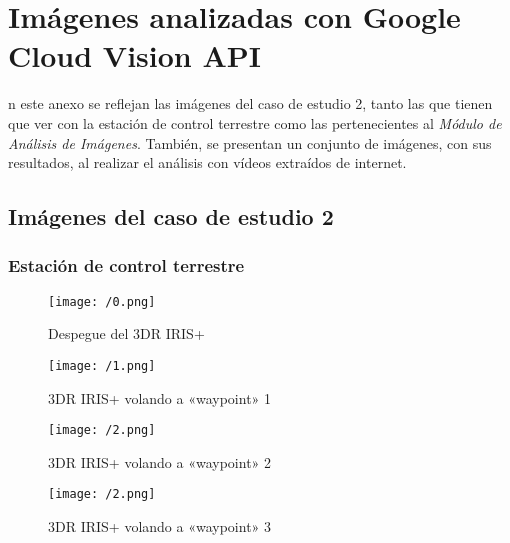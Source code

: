 \chapter{Imágenes analizadas con Google Cloud Vision \acs{API}}
\label{chap:imagenes}

n este anexo se reflejan las imágenes del caso de estudio 2, tanto las que tienen que ver con la estación de control terrestre como las pertenecientes al \textit{Módulo de Análisis de Imágenes}. También, se presentan un conjunto de imágenes, con sus resultados, al realizar el análisis con vídeos extraídos de internet.

\section{Imágenes del caso de estudio 2}

\subsection{Estación de control terrestre}

\begin{figure}[!h]
\begin{center}
\texttt{[image: /0.png]}
\caption[Despegue del 3DR IRIS+]{Despegue del 3DR IRIS+}
\label{fig:despegue1}
\end{center}
\end{figure}

\begin{figure}[!h]
\begin{center}
\texttt{[image: /1.png]}
\caption[3DR IRIS+ volando a «waypoint» 1]{3DR IRIS+ volando a «waypoint» 1}
\label{fig:despegue2}
\end{center}
\end{figure}

\begin{figure}[!h]
\begin{center}
\texttt{[image: /2.png]}
\caption[3DR IRIS+ volando a «waypoint» 2]{3DR IRIS+ volando a «waypoint» 2}
\label{fig:despegue3}
\end{center}
\end{figure}

\begin{figure}[!h]
\begin{center}
\texttt{[image: /2.png]}
\caption[3DR IRIS+ volando a «waypoint» 3]{3DR IRIS+ volando a «waypoint» 3}
\label{fig:despegue4}
\end{center}
\end{figure}

